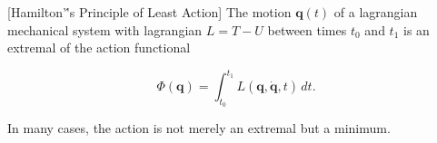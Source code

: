 [Hamilton'\''s Principle of Least Action] The motion $\mathbf{q}(t)$ of a lagrangian mechanical system with lagrangian $L = T - U$ between times $t_0$ and $t_1$ is an extremal of the action functional

$$\Phi(\mathbf{q}) = \int_{t_0}^{t_1} L(\mathbf{q}, \dot{\mathbf{q}}, t)\, dt.$$

In many cases, the action is not merely an extremal but a minimum.
